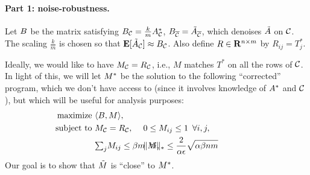 \paragraph{Part 1: noise-robustness.} Let $B$ be the matrix satisfying 
$B_{\mathcal{C}} = \frac{k}{m}A^*_{\mathcal{C}}$, $B_{\overline{\mathcal{C}}} = \tilde{A}_{\overline{\mathcal{C}}}$, 
which denoises $\tilde{A}$ on $\mathcal{C}$.
The scaling $\frac{k}{m}$ is chosen so that 
$\mathbf{E}[\tilde{A}_{\mathcal{C}}] \approx B_{\mathcal{C}}$.
Also define $R \in \mathbf{R}^{n \times m}$ by $R_{ij} = T_j^*$.

Ideally, we would like to have $M_{\mathcal{C}} = R_{\mathcal{C}}$, i.e., $M$ matches $T^*$ on 
all the rows of $\mathcal{C}$. In light of this, 
we will let $M^*$ be the solution to the following ``corrected'' program, which 
we don't have access to (since it involves knowledge of $A^*$ and $\mathcal{C}$), 
but which will be useful for analysis purposes:
\begin{align}
\label{eq:optimization-noiseless}
\text{maximize } &\langle \Aa, M \rangle, \\
\notag \text{ subject to } &M_{\good} = R_{\good}, 
  &&\hskip-0.4in 0 \leq M_{ij} \leq 1 \,\,\, \forall i,j,  \\
\notag  &{\textstyle \sum_j} M_{ij} \leq \beta m \,\,\, \forall i, 
  &&\hskip-0.4in \|M\|_* \leq \frac{2}{\alpha\epsilon}\sqrt{\alpha\beta nm} \phantom{xxxxxxx}
\end{align}
Our goal is to show that $\tilde{M}$ is ``close'' to $M^*$. 
